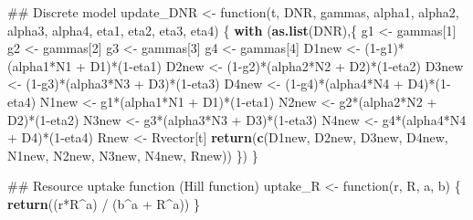 \documentclass[11pt,]{article}
\newenvironment{Shaded}{\begin{snugshade}}{\end{snugshade}}
\newcommand{\KeywordTok}[1]{\textcolor[rgb]{0.13,0.29,0.53}{\textbf{{#1}}}}
\newcommand{\DecValTok}[1]{\textcolor[rgb]{0.00,0.00,0.81}{{#1}}}
\newcommand{\StringTok}[1]{\textcolor[rgb]{0.31,0.60,0.02}{{#1}}}
\newcommand{\NormalTok}[1]{{#1}}
\begin{document}
\begin{Shaded}
\begin{Highlighting}[]
  \NormalTok{## Discrete model}
  \NormalTok{update_DNR <-}\StringTok{ }\NormalTok{function(t, DNR, gammas,}
                         \NormalTok{alpha1, alpha2, alpha3, alpha4,}
                         \NormalTok{eta1, eta2, eta3, eta4) \{}
    \KeywordTok{with} \NormalTok{(}\KeywordTok{as.list}\NormalTok{(DNR),\{}
      \NormalTok{g1    <-}\StringTok{ }\NormalTok{gammas[}\DecValTok{1}\NormalTok{]}
      \NormalTok{g2    <-}\StringTok{ }\NormalTok{gammas[}\DecValTok{2}\NormalTok{]}
      \NormalTok{g3    <-}\StringTok{ }\NormalTok{gammas[}\DecValTok{3}\NormalTok{]}
      \NormalTok{g4    <-}\StringTok{ }\NormalTok{gammas[}\DecValTok{4}\NormalTok{]}
      \NormalTok{D1new <-}\StringTok{ }\NormalTok{(}\DecValTok{1}\NormalTok{-g1)*(alpha1*N1 +}\StringTok{ }\NormalTok{D1)*(}\DecValTok{1}\NormalTok{-eta1)}
      \NormalTok{D2new <-}\StringTok{ }\NormalTok{(}\DecValTok{1}\NormalTok{-g2)*(alpha2*N2 +}\StringTok{ }\NormalTok{D2)*(}\DecValTok{1}\NormalTok{-eta2)}
      \NormalTok{D3new <-}\StringTok{ }\NormalTok{(}\DecValTok{1}\NormalTok{-g3)*(alpha3*N3 +}\StringTok{ }\NormalTok{D3)*(}\DecValTok{1}\NormalTok{-eta3)}
      \NormalTok{D4new <-}\StringTok{ }\NormalTok{(}\DecValTok{1}\NormalTok{-g4)*(alpha4*N4 +}\StringTok{ }\NormalTok{D4)*(}\DecValTok{1}\NormalTok{-eta4)}
      \NormalTok{N1new <-}\StringTok{ }\NormalTok{g1*(alpha1*N1 +}\StringTok{ }\NormalTok{D1)*(}\DecValTok{1}\NormalTok{-eta1)}
      \NormalTok{N2new <-}\StringTok{ }\NormalTok{g2*(alpha2*N2 +}\StringTok{ }\NormalTok{D2)*(}\DecValTok{1}\NormalTok{-eta2)}
      \NormalTok{N3new <-}\StringTok{ }\NormalTok{g3*(alpha3*N3 +}\StringTok{ }\NormalTok{D3)*(}\DecValTok{1}\NormalTok{-eta3)}
      \NormalTok{N4new <-}\StringTok{ }\NormalTok{g4*(alpha4*N4 +}\StringTok{ }\NormalTok{D4)*(}\DecValTok{1}\NormalTok{-eta4)}
      \NormalTok{Rnew  <-}\StringTok{ }\NormalTok{Rvector[t]}
      \KeywordTok{return}\NormalTok{(}\KeywordTok{c}\NormalTok{(D1new, D2new, D3new, D4new, N1new, N2new, N3new, N4new, Rnew))}
    \NormalTok{\})}
  \NormalTok{\}}
  
  \NormalTok{##  Resource uptake function (Hill function)}
  \NormalTok{uptake_R <-}\StringTok{ }\NormalTok{function(r, R, a, b) \{}
    \KeywordTok{return}\NormalTok{((r*R^a) /}\StringTok{ }\NormalTok{(b^a +}\StringTok{ }\NormalTok{R^a))}
  \NormalTok{\}}
  

\end{Highlighting}
\end{Shaded}
\end{document}
